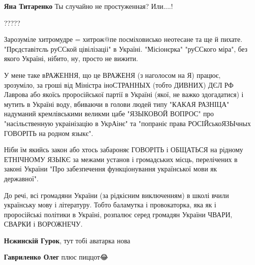 \begin{itemize}
\begin{itemize}
\textbf{Яна Титаренко} Ты случайно не простуженная? Или....!

 
?????
\end{itemize}

 

Зарозуміле хитромудре = хитрож@пе посміховисько неотесане та ще й пихате.
"Прєдставітєль руССкой цівілізаціі" в Україні. "Місіонєрка" "руССкого міра",
без якого Україні, нібито, ну, просто не вижити. 

У мене таке вРАЖЕННЯ, що це ВРАЖЕНЯ (з наголосом на Я) працює, зрозуміло, за
гроші від Міністра іноСТРАННЫХ (тобто ДИВНИХ) ДЄЛ РФ Лаврова або якоїсь
проросійської партії в Україні (якої, не важко здогадатися) і мутить в Україні
воду, вбиваючи в голови людей типу "КАКАЯ РАЗНІЦА" надуманий кремлівськими
великми цабе "ЯЗЫКОВОЙ ВОПРОС" про "насільственную украінізацію в УкрАінє" та
"попраніє права РОСІЙськоЯЗЫчных ГОВОРІТЬ на родном языкє". 

Ніби їм якийсь закон або хтось забароняє ГОВОРІТЬ і
ОБЩАТЬСЯ на рідному ЕТНІЧНОМУ ЯЗЫКЄ за межами установ і громадських місць,
перелічених в законі України "Про забезпечення функціонування української мови
як державної". 

До речі, всі громадяни України (за рідкісним виключенням) в школі вчили
українську мову і літературу. Тобто баламутка і провокаторка, яка як і
проросійські політики в Україні, розпалює серед громадян України ЧВАРИ, СВАРКИ
і ВОРОЖНЕЧУ.

 
\textbf{Нєжинскій Гурок}, тут тобі аватарка нова

\begin{itemize}
 
\textbf{Гавриленко Олег} плюс пиццот😂
\end{itemize}

 


\end{itemize}
